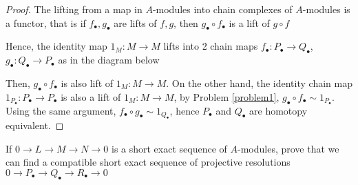 \begin{proof}
	The lifting from a map in $A$-modules into chain complexes of $A$-modules is a functor, that is if $f_\bullet, g_\bullet$ are lifts of $f, g$, then $g_\bullet \circ f_\bullet$ is a lift of $g \circ f$
	\begin{center}
	\end{center}
	
	Hence, the identity map $1_M: M \to M$ lifts into 2 chain maps $f_\bullet : P_\bullet \to Q_\bullet$, $g_\bullet : Q_\bullet \to P_\bullet$ as in the diagram below
	\begin{center}
	\end{center}
	
	Then, $g_\bullet \circ f_\bullet$ is also lift of $1_M: M \to M$. On the other hand, the identity chain map $1_{P_\bullet}: P_\bullet \to P_\bullet$ is also a lift of $1_M: M \to M$, by Problem \ref{problem1}, $g_\bullet \circ f_\bullet \sim 1_{P_\bullet}$. Using the same argument, $f_\bullet \circ g_\bullet \sim 1_{Q_\bullet}$, hence $P_\bullet$ and $Q_\bullet$ are homotopy equivalent.
	
\end{proof}

\begin{problem} [problem 3]
	\label{problem3}
	If $0 \to L \to M \to N \to 0$ is a short exact sequence of $A$-modules, prove that we can find a compatible short exact sequence of projective resolutions $0 \to P_\bullet \to Q_\bullet \to R_\bullet \to 0$
\end{problem}

